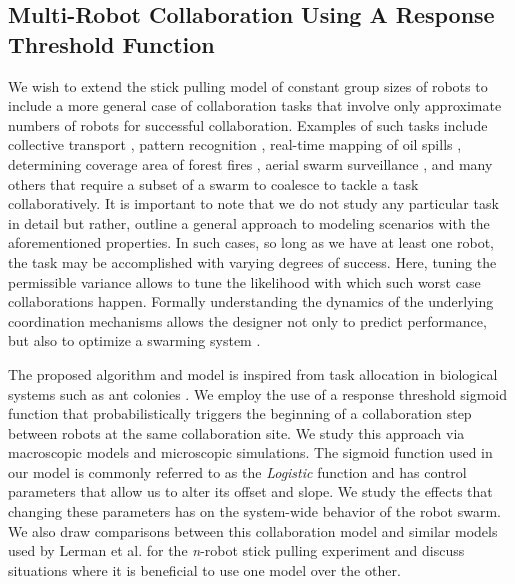 \documentclass[Main.tex]{subfiles}
\begin{document}
\subsection{Multi-Robot Collaboration Using A Response Threshold Function}

We wish to extend the stick pulling model of constant group sizes of robots to include a more general case of collaboration tasks that involve only approximate numbers of robots for successful collaboration. Examples of such tasks include collective transport \cite{sugawara2012}, pattern recognition \cite{beni1993swarm}, real-time mapping of oil spills \cite{beni2005swarm}, determining coverage area of forest fires \cite{krishnanand2006glowworm}, aerial swarm surveillance \cite{dantu2012comparison}, and many others that require a subset of a swarm to coalesce to tackle a task collaboratively. It is important to note that we do not study any particular task in detail but rather, outline a general approach to modeling scenarios with the aforementioned properties. In such cases, so long as we have at least one robot, the task may be accomplished with varying degrees of success. Here, tuning the permissible variance allows to tune the likelihood with which such worst case collaborations happen. Formally understanding the dynamics of the underlying coordination mechanisms allows the designer not only to predict performance, but also to optimize a swarming system \cite{Correll2008}.  

The proposed algorithm and model is inspired from task allocation in biological systems such as ant colonies \cite{Bonabeau1999,Krieger2000}. We employ the use of a response threshold sigmoid function that probabilistically triggers the beginning of a collaboration step between robots at the same collaboration site. We study this approach via macroscopic models and microscopic simulations.
The sigmoid function used in our model is commonly referred to as the \emph{Logistic} function and has control parameters that allow us to alter its offset and slope. We study the effects that changing these parameters has on the system-wide behavior of the robot swarm. We also draw comparisons between this collaboration model and similar models used by Lerman et al. for the \emph{n}-robot stick pulling experiment \cite{Lerman2001} and discuss situations where it is beneficial to use one model over the other.
\end{document}
